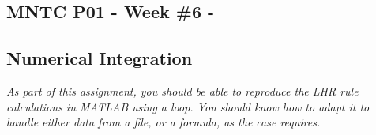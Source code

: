 


\usepackage{bbding} %


\newcommand{\ub}{\underbrace}

\begin{center}
\subsection*{MNTC P01 - Week \#6 - \WeekTitleSix}
\end{center}

\subsection*{Numerical Integration}

{\em As part of this assignment, you should be able to reproduce the
  LHR rule calculations in MATLAB using a loop. You should know how to
  adapt it to handle either data from a file, or a formula, as the case requires.}

